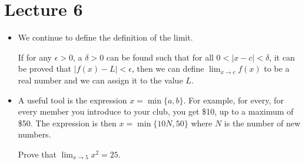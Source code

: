 \section{Lecture 6}
\begin{itemize}
    \item We continue to define the definition of the limit.
    \begin{definition}
        If for any $\epsilon>0$, a $\delta>0$ can be found such that for all $0<|x-c|<\delta$, it can be proved that $|f(x)-L|<\epsilon$, then we can define $\lim_{x\to c}f(x)$ to be a real number and we can assign it to the value $L$.
    \end{definition}
    \item A useful tool is the expression $x=\min\{a,b\}$. For example, for every, for every member you introduce to your club, you get \$10, up to a maximum of \$50. The expression is then $x=\min\{10N,50\}$ where $N$ is the number of new numbers.
    \begin{example}
        Prove that $\displaystyle\lim_{x\to 5}x^2=25$.


\end{example}
\end{itemize}
